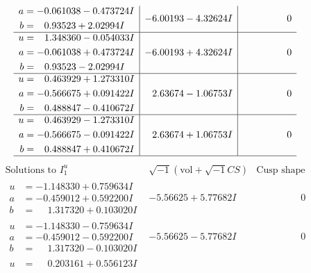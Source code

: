 \documentclass[1p]{elsarticle_modified}
\theoremstyle{definition}
\newcommand{\I}{\sqrt{-1}}
\begin{document}
$$\begin{array}{c|c|c}
\begin{aligned}
a &= -0.061038 - 0.473724 I \\
b &= \phantom{-}0.93523 + 2.02994 I\end{aligned}
 & -6.00193 - 4.32624 I & \phantom{-0.000000 } 0 \\ \hline\begin{aligned}
u &= \phantom{-}1.348360 - 0.054033 I \\
a &= -0.061038 + 0.473724 I \\
b &= \phantom{-}0.93523 - 2.02994 I\end{aligned}
 & -6.00193 + 4.32624 I & \phantom{-0.000000 } 0 \\ \hline\begin{aligned}
u &= \phantom{-}0.463929 + 1.273310 I \\
a &= -0.566675 + 0.091422 I \\
b &= \phantom{-}0.488847 - 0.410672 I\end{aligned}
 & \phantom{-}2.63674 - 1.06753 I & \phantom{-0.000000 } 0 \\ \hline\begin{aligned}
u &= \phantom{-}0.463929 - 1.273310 I \\
a &= -0.566675 - 0.091422 I \\
b &= \phantom{-}0.488847 + 0.410672 I\end{aligned}
 & \phantom{-}2.63674 + 1.06753 I & \phantom{-0.000000 } 0\\
 \hline 
 \end{array}$$\newpage$$\begin{array}{c|c|c}  
\text{Solutions to }I^u_{1}& \I (\text{vol} + \sqrt{-1}CS) & \text{Cusp shape}\\
 \hline 
\begin{aligned}
u &= -1.148330 + 0.759634 I \\
a &= -0.459012 + 0.592200 I \\
b &= \phantom{-}1.317320 + 0.103020 I\end{aligned}
 & -5.56625 + 5.77682 I & \phantom{-0.000000 } 0 \\ \hline\begin{aligned}
u &= -1.148330 - 0.759634 I \\
a &= -0.459012 - 0.592200 I \\
b &= \phantom{-}1.317320 - 0.103020 I\end{aligned}
 & -5.56625 - 5.77682 I & \phantom{-0.000000 } 0 \\ \hline\begin{aligned}
u &= \phantom{-}0.203161 + 0.556123 I \\

\end{aligned}
\end{array}$$
\end{document}
